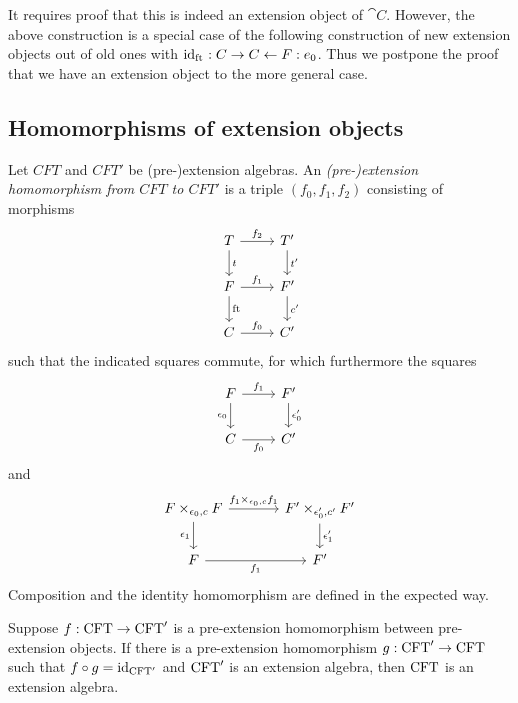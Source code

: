 It requires proof that this is indeed an extension object of $\cat{C}$. However, the above
construction is a special case of the following construction of new extension objects out
of old ones with ${\mathrm{id}_{\mathrm{ft}_{}}}:C\rightarrow C\leftarrow F:e_0$. Thus we postpone the proof
that we have an extension object to the more general case. 

\subsection{Homomorphisms of extension objects}
\begin{defn}
Let $CFT$ and $CFT'$ be (pre-)extension algebras. An \emph{(pre-)extension homomorphism from 
$CFT$ to $CFT'$} is a triple $(f_0,f_1,f_2)$ consisting of morphisms
\begin{equation*}
\begin{tikzcd}
T 
  \ar{r}{f_2}
  \ar{d}{t}
  &
T'
  \ar{d}{t'}
  \\
F 
  \ar{r}{f_1}
  \ar{d}{\eft}
  &
F'
  \ar{d}{c'}
  \\
C 
  \ar{r}{f_0}
  &
C'
\end{tikzcd}
\end{equation*}
such that the indicated squares commute, for which furthermore the squares
\begin{equation*}
\begin{tikzcd}
F \ar{r}{f_1}
  \ar{d}[swap]{\epsilon_0}
  &
F'
  \ar{d}{\epsilon_0'}
  \\
C \ar{r}[swap]{f_0}
  &
C'
\end{tikzcd}
\end{equation*}
and
\begin{equation*}
\begin{tikzcd}[column sep=large]
F\times_{\epsilon_0,c} F
  \ar{r}{f_1\times_{\epsilon_0,c} f_1}
  \ar{d}[swap]{\epsilon_1}
  &
F'\times_{\epsilon_0',c'} F'
  \ar{d}{\epsilon_1'}
  \\
F \ar{r}[swap]{f_1}
  &
F'
\end{tikzcd}
\end{equation*}
Composition and the identity homomorphism are defined in the expected way.
\end{defn}

\begin{lem}
Suppose $f:\mathrm{CFT}\to\mathrm{CFT}'$ is a pre-extension homomorphism between
pre-extension objects. If there is a pre-extension homomorphism $g:\mathrm{CFT}'\to
\mathrm{CFT}$ such that $f\circ g={\mathrm{id}_{\mathrm{CFT}'}}$ and $\mathrm{CFT}'$ is an extension
algebra, then $\mathrm{CFT}$ is an extension algebra.
\end{lem}

